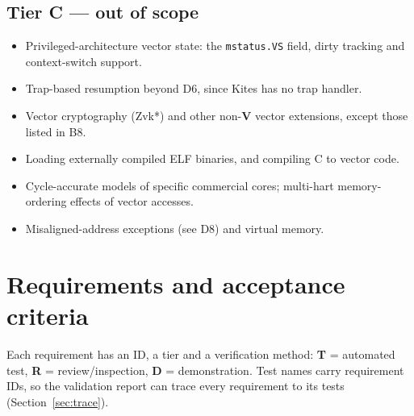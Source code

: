 \documentclass[11pt]{article}
\begin{document}
\subsection{Tier C --- out of scope}\label{sec:tierC}
\begin{itemize}
\item Privileged-architecture vector state: the \texttt{mstatus.VS} field, dirty tracking and context-switch support.
\item Trap-based resumption beyond D6, since Kites has no trap handler.
\item Vector cryptography (Zvk*) and other non-\textbf{V} vector extensions, except those listed in B8.
\item Loading externally compiled ELF binaries, and compiling C to vector code.
\item Cycle-accurate models of specific commercial cores; multi-hart memory-ordering effects of vector accesses.
\item Misaligned-address exceptions (see D8) and virtual memory.
\end{itemize}

\section{Requirements and acceptance criteria}\label{sec:requirements}

Each requirement has an ID, a tier and a verification method: \textbf{T} = automated test,
\textbf{R} = review/inspection, \textbf{D} = demonstration. Test names carry requirement IDs, so the
validation report can trace every requirement to its tests (Section~\ref{sec:trace}).
\end{document}
